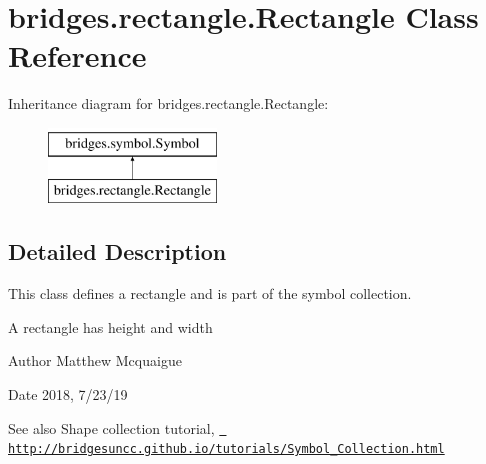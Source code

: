 \hypertarget{classbridges_1_1rectangle_1_1_rectangle}{}\section{bridges.\+rectangle.\+Rectangle Class Reference}
\label{classbridges_1_1rectangle_1_1_rectangle}
Inheritance diagram for bridges.\+rectangle.\+Rectangle\+:\begin{figure}[H]
\begin{center}
\leavevmode
\includegraphics[height=2.000000cm]{classbridges_1_1rectangle_1_1_rectangle}
\end{center}
\end{figure}


\subsection{Detailed Description}
This class defines a rectangle and is part of the symbol collection. 

A rectangle has height and width

\begin{DoxyAuthor}{Author}
Matthew Mcquaigue 
\end{DoxyAuthor}
\begin{DoxyDate}{Date}
2018, 7/23/19
\end{DoxyDate}
\begin{DoxySeeAlso}{See also}
Shape collection tutorial, \href{http://bridgesuncc.github.io/tutorials/Symbol_Collection.html}{\texttt{ http\+://bridgesuncc.\+github.\+io/tutorials/\+Symbol\+\_\+\+Collection.\+html}} 
\end{DoxySeeAlso}
